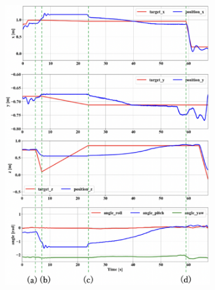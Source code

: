 \documentclass{jarticle}
\begin{document}
\vspace{-2mm}
\begin{figure}[h]
  \centering
  \begin{subfigure}{0.38\columnwidth}
    \includegraphics[width=\textwidth]{figs/plot1.eps}
    \vspace{-6mm}
    \caption{}
    \label{fig:plot1}
  \end{subfigure}
  \begin{subfigure}{0.38\columnwidth}

\end{subfigure}
\end{figure}
\end{document}
